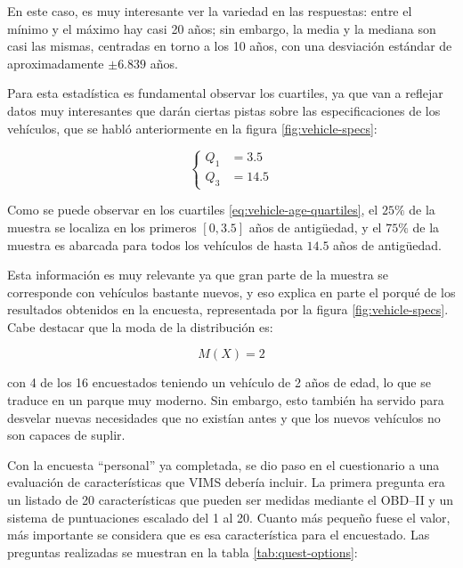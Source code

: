 En este caso, es muy interesante ver la variedad en las respuestas: entre el mínimo
y el máximo hay casi 20 años; sin embargo, la media y la mediana son casi las mismas,
centradas en torno a los 10 años, con una desviación estándar de aproximadamente
$\pm 6.839$ años.

Para esta estadística es fundamental observar los cuartiles, ya que van a reflejar
datos muy interesantes que darán ciertas pistas sobre las especificaciones de los
vehículos, que se habló anteriormente en la figura \ref{fig:vehicle-specs}:

\begin{equation}\label{eq:vehicle-age-quartiles}
  \left\{
  \begin{aligned}
    Q_1 & = 3.5  \\
    Q_3 & = 14.5
  \end{aligned}
  \right.
\end{equation}

Como se puede observar en los cuartiles \ref{eq:vehicle-age-quartiles}, el $25\%$ de
la muestra se localiza en los primeros $\left[0, 3.5\right]$ años de antigüedad, y el
$75\%$ de la muestra es abarcada para todos los vehículos de hasta $14.5$ años de
antigüedad.

Esta información es muy relevante ya que gran parte de la muestra se corresponde con
vehículos bastante nuevos, y eso explica en parte el porqué de los resultados obtenidos
en la encuesta, representada por la figura \ref{fig:vehicle-specs}. Cabe destacar
que la moda de la distribución es:

\begin{equation}\label{eq:vehicle-age-mode}
  M\left(X\right) = 2
\end{equation}

con 4 de los 16 encuestados teniendo un vehículo de 2 años de edad, lo que se traduce
en un parque muy moderno. Sin embargo, esto también ha servido para desvelar nuevas
necesidades que no existían antes y que los nuevos vehículos no son capaces de
suplir.

Con la encuesta ``personal'' ya completada, se dio paso en el cuestionario a una
evaluación de características que \ac{VIMS} debería incluir. La primera pregunta era
un listado de 20 características que pueden ser medidas mediante el \ac{OBD}--II
y un sistema de puntuaciones escalado del 1 al 20. Cuanto más pequeño fuese el valor,
más importante se considera que es esa característica para el encuestado. Las preguntas
realizadas se muestran en la tabla \ref{tab:quest-options}:

